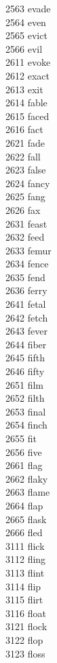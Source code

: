 2563 evade \\
2564 even \\
2565 evict \\
2566 evil \\
2611 evoke \\
2612 exact \\
2613 exit \\
2614 fable \\
2615 faced \\
2616 fact \\
2621 fade \\
2622 fall \\
2623 false \\
2624 fancy \\
2625 fang \\
2626 fax \\
2631 feast \\
2632 feed \\
2633 femur \\
2634 fence \\
2635 fend \\
2636 ferry \\
2641 fetal \\
2642 fetch \\
2643 fever \\
2644 fiber \\
2645 fifth \\
2646 fifty \\
2651 film \\
2652 filth \\
2653 final \\
2654 finch \\
2655 fit \\
2656 five \\
2661 flag \\
2662 flaky \\
2663 flame \\
2664 flap \\
2665 flask \\
2666 fled \\
3111 flick \\
3112 fling \\
3113 flint \\
3114 flip \\
3115 flirt \\
3116 float \\
3121 flock \\
3122 flop \\
3123 floss \\
